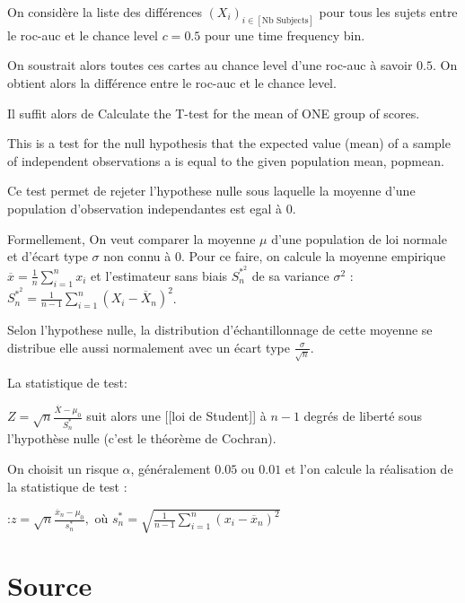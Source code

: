 On considère la liste des différences $(X_i)_{i \in [\text{Nb Subjects}]}$ pour tous les sujets entre le roc-auc et le chance level $c=0.5$ pour une time frequency bin.

On soustrait alors toutes ces cartes au chance level d'une roc-auc à savoir $0.5$. On obtient alors la différence entre le roc-auc et le chance level.

Il suffit alors de Calculate the T-test for the mean of ONE group of scores.

This is a test for the null hypothesis that the expected value (mean) of a sample of independent observations a is equal to the given population mean, popmean.

Ce test permet de rejeter l'hypothese nulle sous laquelle la moyenne d'une population d'observation independantes est egal à $0$.

Formellement,
On veut comparer la moyenne $\mu$ d'une population de loi normale et d’écart type $\sigma$ non connu à $0$. Pour ce faire, on calcule la moyenne empirique $\overline{x} = \frac{1}{n}\sum_{i=1}^{n}x_i$ et l'estimateur  sans biais $S^{\ast ^2}_n$ de sa variance $\sigma^2$
:$S^{\ast ^2}_n = \frac{1}{n-1}\sum\limits_{i=1}^n (X_i - \overline X_n )^2$.

Selon l’hypothese nulle, la distribution d’échantillonnage de cette moyenne se distribue elle aussi normalement avec un écart type $\frac{\sigma}{\sqrt{n}}$.

La statistique de test:

$ Z = \sqrt{n}\frac{\overline{X} - \mu_0}{S^{\ast}_n}$
suit alors une [[loi de Student]] à $n-1$ degrés de liberté sous l'hypothèse nulle (c'est le théorème de Cochran).

On choisit un risque $\alpha$, généralement $0.05$ ou $0.01$ et l'on calcule la réalisation de la statistique de test :

:$z = \sqrt{n}\frac{\overline{x}_n - \mu_0}{s^{\ast}_n},$ où $s^{\ast}_n =\sqrt{\frac{1}{n-1}\sum\limits_{i=1}^n (x_i - \overline x_n )^2} $






\chapter{Source}
